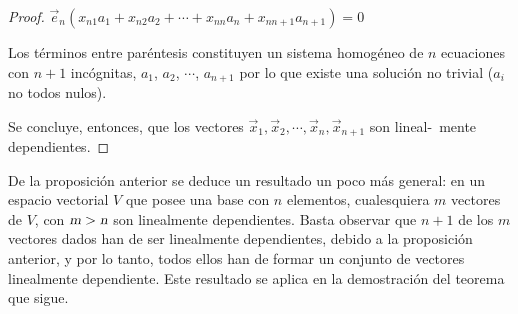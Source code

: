 \begin{theorem}
\begin{proof}
  $\vec{e}_n ( x_{n1}a_1+x_{n2}a_2+\cdots  +x_{nn}a_n   +x_{nn+1}a_{n +1})=0  $
  
  \bigskip
  
  Los términos entre paréntesis constituyen  un sistema homogéneo de $n$ ecuaciones con $n+1$ incógnitas, $a_1$, $a_2$,   $\cdots$, $a_{n+1}$ por lo que  existe  una solución no trivial ($a_i$ no todos nulos). 
  
  \bigskip
  
  Se concluye, entonces, que  los vectores $\vec{x}_1,\vec{x}_2,\cdots, \vec{x}_n, \vec{x}_{n +1} $ son lineal-\ mente dependientes.
  
  
  
  \end{proof}
\end{theorem} 

\bigskip


\begin{remark}
De la proposición anterior se deduce un resultado un poco más general: en un espacio vectorial $V$ que posee una base con $n$ elementos, cualesquiera $m$ vectores de $V$, con $\textsl{m}>\textsl{n}$ son linealmente dependientes. Basta observar que $n+1$ de los $m$ vectores dados han de ser linealmente dependientes, debido a la proposición anterior, y por lo tanto, todos ellos han de formar un conjunto de vectores linealmente dependiente. Este resultado se aplica en la demostración del teorema que sigue.
\end{remark}

\bigskip

\bigskip

\bigskip

